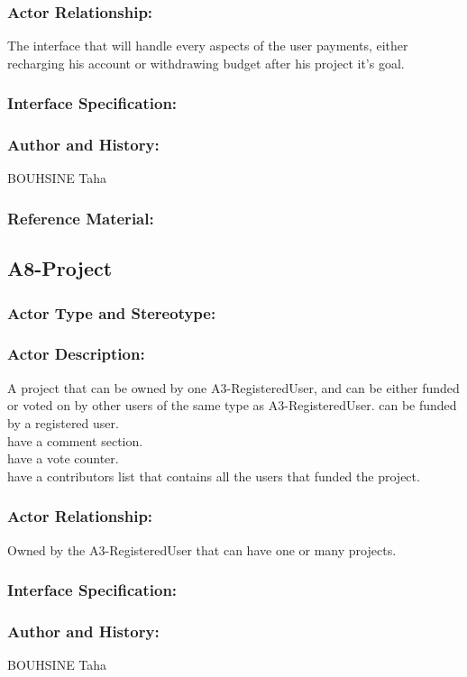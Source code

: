 \documentclass[11pt, openany]{report}
\begin{document}
\subsubsection{Actor Relationship:}
The interface that will handle every aspects of the user payments, either recharging his account or withdrawing budget after his project it's goal.
\subsubsection{Interface Specification:}
\subsubsection{Author and History:}
BOUHSINE Taha
\subsubsection{Reference Material:}

\clearpage
\subsection{A8-Project}
\label{A8}
\subsubsection{Actor Type and Stereotype:}
\subsubsection{Actor Description:}
A project that can be owned by one A3-RegisteredUser, and can be either funded or voted on by other users of the same type as A3-RegisteredUser.
can be funded by a registered user.\\
have a comment section.\\
have a vote counter.\\
have a contributors list that contains all the users that funded the project.\\

\subsubsection{Actor Relationship:}
Owned by the A3-RegisteredUser that can have one or many projects.
\subsubsection{Interface Specification:}
\subsubsection{Author and History:}
BOUHSINE Taha
\end{document}

